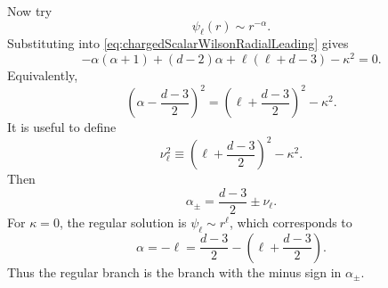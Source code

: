 \documentclass[11pt]{article}
\newcommand{\defeq}{\equiv}
\begin{document}
Now try
\begin{equation}
  \psi_\ell(r)\sim r^{-\alpha} .
\end{equation}
Substituting into \eqref{eq:chargedScalarWilsonRadialLeading} gives
\begin{equation}
  -\alpha(\alpha+1)+(d-2)\alpha
  +\ell(\ell+d-3)-\kappa^2=0 .
\end{equation}
Equivalently,
\begin{equation}
  \left(\alpha-\frac{d-3}{2}\right)^2
  =
  \left(\ell+\frac{d-3}{2}\right)^2-\kappa^2 .
  \label{eq:WilsonLineIndicialEquation}
\end{equation}
It is useful to define
\begin{equation}
  \nu_\ell^2
  \defeq
  \left(\ell+\frac{d-3}{2}\right)^2-\kappa^2 .
  \label{eq:nuWilsonLine}
\end{equation}
Then
\begin{equation}
  \alpha_\pm=\frac{d-3}{2}\pm \nu_\ell .
\end{equation}
For $\kappa=0$, the regular solution is $\psi_\ell\sim r^\ell$, which corresponds to
\begin{equation}
  \alpha= -\ell
  =\frac{d-3}{2}-\left(\ell+\frac{d-3}{2}\right) .
\end{equation}
Thus the regular branch is the branch with the minus sign in $\alpha_\pm$.
\end{document}
